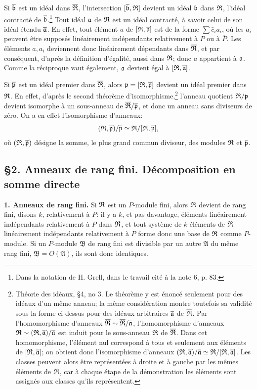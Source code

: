 Si $\overline{\mathfrak b}$ est un idéal dans $\overline{\mathfrak R}$, l'intersection $[\overline{\mathfrak b},\mathfrak R]$ devient un idéal $\mathfrak b$ dans $\mathfrak R$, l'idéal contracté de $\overline{\mathfrak b}$.\footnote{Dans la notation de H. Grell, dans le travail cité à la note 6, p. 83.} Tout idéal $\mathfrak a$ de $\mathfrak R$ est un idéal contracté, à savoir celui de son idéal étendu $\overline{\mathfrak a}$. En effet, tout élément $a$ de $[\mathfrak R,\overline{\mathfrak a}]$ est de la forme $\sum \bar c_i a_i$, où les $a_i$ peuvent être supposés linéairement indépendants relativement à $P$ ou à $\overline P$. Les éléments $a,a_i$ deviennent donc linéairement dépendants dans $\overline{\mathfrak R}$, et par conséquent, d'après la définition d'égalité, aussi dans $\mathfrak R$; donc $a$ appartient à $\mathfrak a$. Comme la réciproque vaut également, $\mathfrak a$ devient égal à $[\mathfrak R,\overline{\mathfrak a}]$.

Si $\overline{\mathfrak p}$ est un idéal premier dans $\overline{\mathfrak R}$, alors $\mathfrak p=[\mathfrak R,\overline{\mathfrak p}]$ devient un idéal premier dans $\mathfrak R$. En effet, d'après le second théorème d'isomorphisme,\footnote{Théorie des idéaux, \S 4, no 3. Le théorème y est énoncé seulement pour des idéaux d'un même anneau; la même considération montre toutefois sa validité sous la forme ci-dessus pour des idéaux arbitraires $\overline{\mathfrak a}$ de $\overline{\mathfrak R}$. Par l'homomorphisme d'anneaux $\overline{\mathfrak R}\sim\overline{\mathfrak R}/\overline{\mathfrak a}$, l'homomorphisme d'anneaux $\mathfrak R\sim(\mathfrak R,\overline{\mathfrak a})/\overline{\mathfrak a}$ est induit pour le sous-anneau $\mathfrak R$ de $\overline{\mathfrak R}$. Dans cet homomorphisme, l'élément nul correspond à tous et seulement aux éléments de $[\mathfrak R,\overline{\mathfrak a}]$; on obtient donc l'isomorphisme d'anneaux $(\mathfrak R,\overline{\mathfrak a})/\overline{\mathfrak a}\simeq \mathfrak R/[\mathfrak R,\overline{\mathfrak a}]$. Les classes peuvent alors être représentées à droite et à gauche par les mêmes éléments de $\mathfrak R$, car à chaque étape de la démonstration les éléments sont assignés aux classes qu'ils représentent.} l'anneau quotient $\mathfrak R/\mathfrak p$ devient isomorphe à un sous-anneau de $\overline{\mathfrak R}/\overline{\mathfrak p}$, et donc un anneau sans diviseurs de zéro. On a en effet l'isomorphisme d'anneaux:
\[
   (\mathfrak R,\overline{\mathfrak p})/\overline{\mathfrak p}
     \simeq \mathfrak R/[\mathfrak R,\overline{\mathfrak p}],
\]
où $(\mathfrak R,\overline{\mathfrak p})$ désigne la somme, le plus grand commun diviseur, des modules $\mathfrak R$ et $\overline{\mathfrak p}$.

\subsection*{\S 2. Anneaux de rang fini. Décomposition en somme directe}

\textbf{1. Anneaux de rang fini.} Si $\mathfrak R$ est un $P$-module fini, alors $\mathfrak R$ devient de rang fini, disons $k$, relativement à $P$: il y a $k$, et pas davantage, éléments linéairement indépendants relativement à $P$ dans $\mathfrak R$, et tout système de $k$ éléments de $\mathfrak R$ linéairement indépendants relativement à $P$ forme donc une base de $\mathfrak R$ comme $P$-module. Si un $P$-module $\mathfrak B$ de rang fini est divisible par un autre $\mathfrak A$ du même rang fini, $\mathfrak B=O(\mathfrak A)$, ils sont donc identiques.

